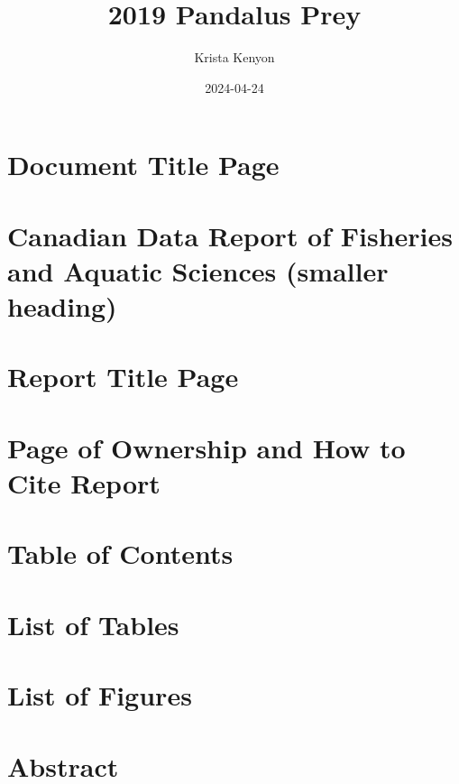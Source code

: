 \documentclass[
]{article}
\title{2019 Pandalus Prey}
\author{Krista Kenyon}
\date{2024-04-24}
\begin{document}
\maketitle

\hypertarget{document-title-page}{%
\section{Document Title Page}\label{document-title-page}}

\hypertarget{canadian-data-report-of-fisheries-and-aquatic-sciences-smaller-heading}{%
\section{Canadian Data Report of Fisheries and Aquatic Sciences (smaller
heading)}\label{canadian-data-report-of-fisheries-and-aquatic-sciences-smaller-heading}}

\hypertarget{report-title-page}{%
\section{Report Title Page}\label{report-title-page}}

\hypertarget{page-of-ownership-and-how-to-cite-report}{%
\section{Page of Ownership and How to Cite
Report}\label{page-of-ownership-and-how-to-cite-report}}

\hypertarget{table-of-contents}{%
\section{Table of Contents}\label{table-of-contents}}

\hypertarget{list-of-tables}{%
\section{List of Tables}\label{list-of-tables}}

\hypertarget{list-of-figures}{%
\section{List of Figures}\label{list-of-figures}}

\hypertarget{abstract}{%
\section{Abstract}\label{abstract}}
\end{document}
